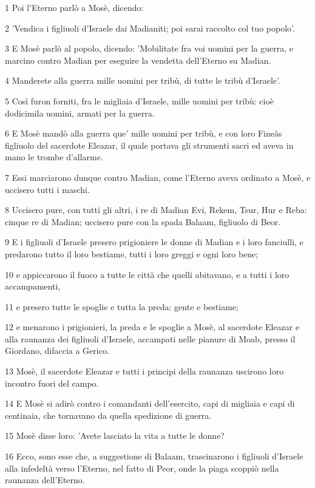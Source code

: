 \par 1 Poi l'Eterno parlò a Mosè, dicendo:
\par 2 'Vendica i figliuoli d'Israele dai Madianiti; poi sarai raccolto col tuo popolo'.
\par 3 E Mosè parlò al popolo, dicendo: 'Mobilitate fra voi uomini per la guerra, e marcino contro Madian per eseguire la vendetta dell'Eterno su Madian.
\par 4 Manderete alla guerra mille uomini per tribù, di tutte le tribù d'Israele'.
\par 5 Così furon forniti, fra le migliaia d'Israele, mille uomini per tribù: cioè dodicimila uomini, armati per la guerra.
\par 6 E Mosè mandò alla guerra que' mille uomini per tribù, e con loro Fineàs figliuolo del sacerdote Eleazar, il quale portava gli strumenti sacri ed aveva in mano le trombe d'allarme.
\par 7 Essi marciarono dunque contro Madian, come l'Eterno aveva ordinato a Mosè, e uccisero tutti i maschi.
\par 8 Uccisero pure, con tutti gli altri, i re di Madian Evi, Rekem, Tsur, Hur e Reba: cinque re di Madian; uccisero pure con la spada Balaam, figliuolo di Beor.
\par 9 E i figliuoli d'Israele presero prigioniere le donne di Madian e i loro fanciulli, e predarono tutto il loro bestiame, tutti i loro greggi e ogni loro bene;
\par 10 e appiccarono il fuoco a tutte le città che quelli abitavano, e a tutti i loro accampamenti,
\par 11 e presero tutte le spoglie e tutta la preda: gente e bestiame;
\par 12 e menarono i prigionieri, la preda e le spoglie a Mosè, al sacerdote Eleazar e alla raunanza dei figliuoli d'Israele, accampati nelle pianure di Moab, presso il Giordano, difaccia a Gerico.
\par 13 Mosè, il sacerdote Eleazar e tutti i principi della raunanza uscirono loro incontro fuori del campo.
\par 14 E Mosè si adirò contro i comandanti dell'esercito, capi di migliaia e capi di centinaia, che tornavano da quella spedizione di guerra.
\par 15 Mosè disse loro: 'Avete lasciato la vita a tutte le donne?
\par 16 Ecco, sono esse che, a suggestione di Balaam, trascinarono i figliuoli d'Israele alla infedeltà verso l'Eterno, nel fatto di Peor, onde la piaga scoppiò nella raunanza dell'Eterno.
